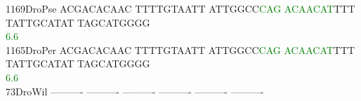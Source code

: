 \documentclass[11pt,twoside,reqno,a4paper]{article}
\begin{document}
{1169\hspace*{1\charwidth}DroPse	ACGACACAAC	TTTTGTAATT	ATTGGCC\textcolor{green}{C}\textcolor{green}{A}\textcolor{green}{G}	\textcolor{green}{A}\textcolor{green}{C}\textcolor{green}{A}\textcolor{green}{A}\textcolor{green}{C}\textcolor{green}{A}\textcolor{green}{T}TTT	TATTGCATAT	TAGCATGGGG	\\
\hspace*{5\charwidth}\hspace*{7\charwidth}\hspace*{1\charwidth}\hspace*{1\charwidth}\hspace*{27\charwidth}\textcolor{green}{6.6}\hspace*{1\charwidth}\hspace*{1\charwidth}\hspace*{1\charwidth}\hspace*{1\charwidth}\\
1165\hspace*{1\charwidth}DroPer	ACGACACAAC	TTTTGTAATT	ATTGGCC\textcolor{green}{C}\textcolor{green}{A}\textcolor{green}{G}	\textcolor{green}{A}\textcolor{green}{C}\textcolor{green}{A}\textcolor{green}{A}\textcolor{green}{C}\textcolor{green}{A}\textcolor{green}{T}TTT	TATTGCATAT	TAGCATGGGG	\\
\hspace*{5\charwidth}\hspace*{7\charwidth}\hspace*{1\charwidth}\hspace*{1\charwidth}\hspace*{27\charwidth}\textcolor{green}{6.6}\hspace*{1\charwidth}\hspace*{1\charwidth}\hspace*{1\charwidth}\hspace*{1\charwidth}\\
73\hspace*{3\charwidth}DroWil	----------	----------	----------	----------	----------	----------	\\
\hspace*{5\charwidth}\hspace*{7\charwidth}\hspace*{1\charwidth}\hspace*{1\charwidth}\hspace*{1\charwidth}\hspace*{1\charwidth}\hspace*{1\charwidth}\hspace*{1\charwidth}\\
}
\end{document}
